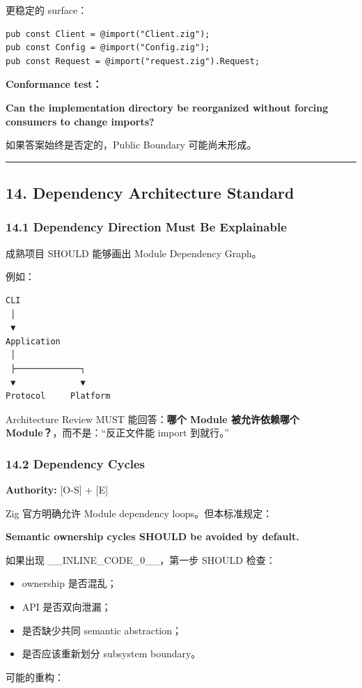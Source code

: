 \documentclass[11pt,a4paper]{article}
\begin{document}
更稳定的 surface：

\begin{lstlisting}[language=zig]
pub const Client = @import("Client.zig");
pub const Config = @import("Config.zig");
pub const Request = @import("request.zig").Request;
\end{lstlisting}
\textbf{Conformance test：}

\begin{gfmBlockquote}
\textbf{Can the implementation directory be reorganized without forcing consumers to change imports?}
\end{gfmBlockquote}
如果答案始终是否定的，Public Boundary 可能尚未形成。

\vspace{0.5em}\hrule\vspace{0.5em}
\subsection{14. Dependency Architecture Standard}
\subsubsection{14.1 Dependency Direction Must Be Explainable}
成熟项目 SHOULD 能够画出 Module Dependency Graph。

例如：

\begin{lstlisting}[language=text]
CLI
 │
 ▼
Application
 │
 ├─────────────┐
 ▼             ▼
Protocol     Platform
\end{lstlisting}
Architecture Review MUST 能回答：\textbf{哪个 Module 被允许依赖哪个 Module？}，而不是：“反正文件能 import 到就行。”

\subsubsection{14.2 Dependency Cycles}
\textbf{Authority:} [O-S] + [E]

Zig 官方明确允许 Module dependency loops。但本标准规定：

\begin{gfmBlockquote}
\textbf{Semantic ownership cycles SHOULD be avoided by default.}
\end{gfmBlockquote}
如果出现 \_\_INLINE\_CODE\_0\_\_，第一步 SHOULD 检查：

\begin{itemize}
  \item ownership 是否混乱；
  \item API 是否双向泄漏；
  \item 是否缺少共同 semantic abstraction；
  \item 是否应该重新划分 subsystem boundary。
\end{itemize}
可能的重构：
\end{document}
